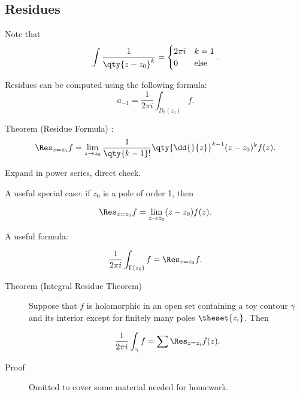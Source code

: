 \hypertarget{residues}{%
\subsection{Residues}\label{residues}}

Note that
\begin{align*}\int \frac{1}{\qty{z-z_0}^k} = \begin{cases} 2\pi i &k = 1 \\ 0 & \text{else}\end{cases}.\end{align*}

Residues can be computed using the following formula: \begin{equation}
a_{-1} = \frac 1 {2\pi i} \int_{D_r(z_0)} f
.\end{equation}

Theorem (Residue Formula) : \begin{align*}
    \Res_{z=z_0} f = \lim_{z\to z_0} \frac{1}{\qty{k-1}!} \qty{\dd{}{z}}^{k-1} (z-z_0)^k f(z)
    .\end{align*}

\begin{description}
\tightlist
\item[Proof]
Expand in power series, direct check.
\end{description}

A useful special case: if \(z_0\) is a pole of order 1, then

\begin{align*}
\Res_{z=z_0} f = \lim_{z\to z_0} (z-z_0) f(z)
.\end{align*}

A useful formula:

\begin{align*}
\frac 1 {2\pi i} \int_{\Gamma(z_0)} f = \Res_{z=z_0} f
.\end{align*}

\begin{description}
\item[Theorem (Integral Residue Theorem)]
Suppose that \(f\) is holomorphic in an open set containing a toy
contour \(\gamma\) and its interior except for finitely many poles
\(\theset{z_i}\). Then

\begin{align*}
\frac 1 {2\pi i} \int_\gamma f = \sum \Res_{z=z_i} f(z)
.\end{align*}
\item[Proof]
Omitted to cover some material needed for homework.
\end{description}

